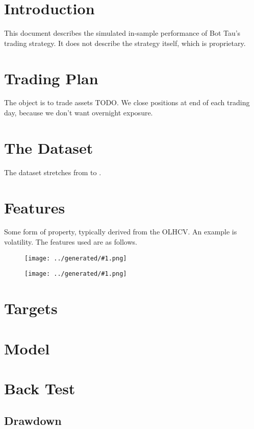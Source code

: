 \documentclass[a4paper]{article}
\title{\documenttitle}
\date{\today}
\author{Frans Englich \\
        \href{mailto:fenglich@fastmail.fm}{fenglich@fastmail.fm}}
\newcommand{\figureTau}[1]{
    \begin{figure}[H]
        \begin{center}
            \texttt{[image: ../generated/\#1.png]}
        \end{center}
    \end{figure}
}
\begin{document}
\maketitle

\tableofcontents

\section{Introduction}

This document describes the simulated in-sample performance of Bot Tau's trading
strategy. It does not describe the strategy itself, which is proprietary.

\section{Trading Plan}

The object is to trade assets TODO. We close positions at end of each trading day, because we don't want overnight exposure.

\section{The Dataset}

The dataset stretches from \constantStartdate to \constantEnddate.

\section{Features}

Some form of property, typically derived from the OLHCV. An example is
volatility. The features used are as follows.

\figureTau{feature_BollingerBands}

\figureTau{feature_RSI}

\section{Targets}

\section{Model}

\section{Back Test}
\subsection{Drawdown}
\end{document}
